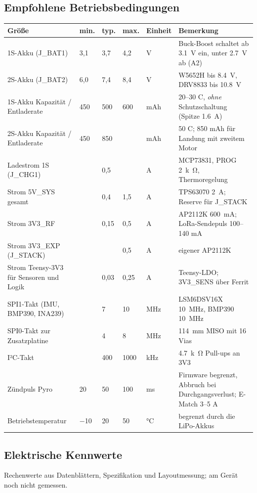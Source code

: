 \documentclass[10pt,a4paper,twoside]{article}
\begin{document}
\subsection{Empfohlene Betriebsbedingungen}
\begin{tabularx}{\textwidth}{L{44mm} L{12mm} L{12mm} L{12mm} L{12mm} X}
\toprule
\textbf{Größe} & \textbf{min.} & \textbf{typ.} & \textbf{max.} & \textbf{Einheit} & \textbf{Bemerkung}\\
\midrule
1S-Akku (J\_BAT1) & 3,1 & 3,7 & 4,2 & V & Buck-Boost schaltet ab \SI{3.1}{V} ein, unter \SI{2.7}{V} ab (A2)\\
2S-Akku (J\_BAT2) & 6,0 & 7,4 & 8,4 & V & W5652H bis \SI{8.4}{V}, DRV8833 bis \SI{10.8}{V}\\
1S-Akku Kapazität / Entladerate & 450 & 500 & 600 & mAh & 20--30 C, \emph{ohne} Schutzschaltung (Spitze \SI{1.6}{A})\\
2S-Akku Kapazität / Entladerate & 450 & 850 & & mAh & 50 C; 850 mAh für Landung mit zweitem Motor\\
Ladestrom 1S (J\_CHG1) & & 0,5 & & A & MCP73831, PROG \SI{2}{k\ohm}, Thermoregelung\\
Strom 5V\_SYS gesamt & & 0,4 & 1,5 & A & TPS63070 \SI{2}{A}; Reserve für J\_STACK\\
Strom 3V3\_RF & & 0,15 & 0,5 & A & AP2112K \SI{600}{mA}; LoRa-Sendepuls 100--140 mA\\
Strom 3V3\_EXP (J\_STACK) & & & 0,5 & A & eigener AP2112K\\
Strom Teensy-3V3 für Sensoren und Logik & & 0,03 & 0,25 & A & Teensy-LDO; 3V3\_SENS über Ferrit\\
SPI1-Takt (IMU, BMP390, INA239) & & 7 & 10 & MHz & LSM6DSV16X \SI{10}{MHz}, BMP390 \SI{10}{MHz}\\
SPI0-Takt zur Zusatzplatine & & 4 & 8 & MHz & \SI{114}{mm} MISO mit 16 Vias\\
I²C-Takt & & 400 & 1000 & kHz & \SI{4.7}{k\ohm} Pull-ups an 3V3\\
Zündpuls Pyro & 20 & 50 & 100 & ms & Firmware begrenzt, Abbruch bei Durchgangsverlust; E-Match 3--5 A\\
Betriebstemperatur & $-$10 & 20 & 50 & \si{\degreeCelsius} & begrenzt durch die LiPo-Akkus\\
\bottomrule
\end{tabularx}

\Needspace{80mm}
\subsection{Elektrische Kennwerte}
Rechenwerte aus Datenblättern, Spezifikation und Layoutmessung; am Gerät noch nicht gemessen.
\end{document}
